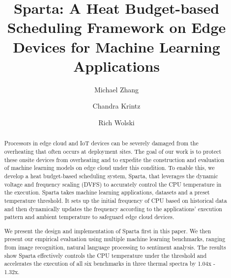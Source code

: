 \documentclass[runningheads]{llncs}
\begin{document}
%

\title{Sparta: A Heat Budget-based Scheduling Framework on Edge Devices for Machine Learning Applications}

%
%


\author{Michael Zhang \and
Chandra Krintz \and
Rich Wolski}


%
\maketitle              %
%


\begin{abstract}
Processors in edge cloud and IoT devices can be severely damaged from the overheating that often occurs at deployment sites. The goal of our work is to protect these onsite devices from overheating and to expedite the construction and evaluation of machine learning models on edge cloud under this condition. To enable this, we develop a heat budget-based scheduling system, Sparta, that leverages the dynamic voltage and frequency scaling (DVFS) to accurately control the CPU temperature in the execution. Sparta takes machine learning applications, datasets and a preset temperature threshold. It sets up the initial frequency of CPU based on historical data and then dynamically updates the frequency according to the applications' execution pattern and ambient temperature to safeguard edge cloud devices.

We present the design and implementation of Sparta first in this paper. We then present our empirical evaluation using multiple machine learning benchmarks, ranging from image recognition, natural language processing to sentiment analysis. The results show Sparta effectively controls the CPU temperature under the threshold and accelerates the execution of all six benchmarks in three thermal spectra by 1.04x - 1.32x. 

\end{abstract}
%
%
%
\end{document}
